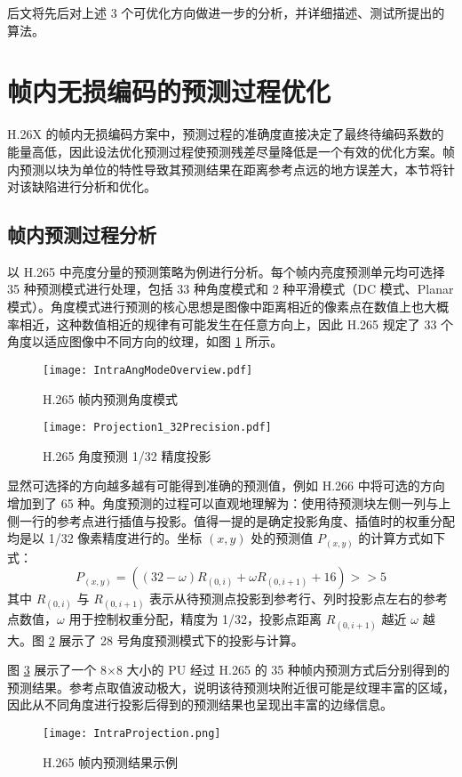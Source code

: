 后文将先后对上述 3 个可优化方向做进一步的分析，并详细描述、测试所提出的算法。

\section{帧内无损编码的预测过程优化}
H.26X 的帧内无损编码方案中，预测过程的准确度直接决定了最终待编码系数的能量高低，因此设法优化预测过程使预测残差尽量降低是一个有效的优化方案。帧内预测以块为单位的特性导致其预测结果在距离参考点远的地方误差大，本节将针对该缺陷进行分析和优化。

\subsection{帧内预测过程分析}
\label{cha:IntraPredDetail}
以 H.265 中亮度分量的预测策略为例进行分析。每个帧内亮度预测单元均可选择 35 种预测模式进行处理，包括 33 种角度模式和 2 种平滑模式（DC 模式、Planar 模式）。角度模式进行预测的核心思想是图像中距离相近的像素点在数值上也大概率相近，这种数值相近的规律有可能发生在任意方向上，因此 H.265 规定了 33 个角度以适应图像中不同方向的纹理，如图 \ref{fig:IntraAngModeOverview} 所示。
\begin{figure}[hbt]
    \centering
    \texttt{[image: IntraAngModeOverview.pdf]}
    \caption{H.265 帧内预测角度模式}
    \label{fig:IntraAngModeOverview}
\end{figure}
\begin{figure}[hbt]
    \centering
    \texttt{[image: Projection1\_32Precision.pdf]}
    \caption{H.265 角度预测 1/32 精度投影}
    \label{fig:Projection1_32Precision}
\end{figure}
显然可选择的方向越多越有可能得到准确的预测值，例如 H.266 中将可选的方向增加到了 65 种。角度预测的过程可以直观地理解为：使用待预测块左侧一列与上侧一行的参考点进行插值与投影。值得一提的是确定投影角度、插值时的权重分配均是以 1/32 像素精度进行的。坐标 $(x,y)$ 处的预测值 $P_{(x,y)}$ 的计算方式如下式：
\begin{equation}
    P_{(x,y)}=((32-\omega)R_{(0,i)}+\omega R_{(0,i+1)}+16)>>5
    \label{equ:IntraProjection}
\end{equation}
其中 $R_{(0,i)}$ 与 $R_{(0,i+1)}$ 表示从待预测点投影到参考行、列时投影点左右的参考点数值，$\omega$ 用于控制权重分配，精度为 1/32，投影点距离 $R_{(0,i+1)}$ 越近 $\omega$ 越大。图 \ref{fig:Projection1_32Precision} 展示了 28 号角度预测模式下的投影与计算。

图 \ref{fig:IntraProjection} 展示了一个 8$\times$8 大小的 PU 经过 H.265 的 35 种帧内预测方式后分别得到的预测结果。参考点取值波动极大，说明该待预测块附近很可能是纹理丰富的区域，因此从不同角度进行投影后得到的预测结果也呈现出丰富的边缘信息。
\begin{figure}[hbt]
    \centering
    \texttt{[image: IntraProjection.png]}
    \caption{H.265 帧内预测结果示例}
    \label{fig:IntraProjection}
\end{figure}

